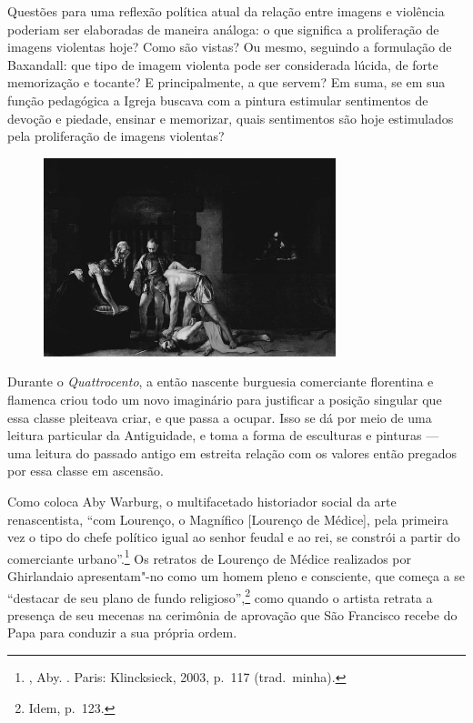 Questões para uma reflexão política atual da relação entre imagens e
violência poderiam ser elaboradas de maneira análoga: o que significa a
proliferação de imagens violentas hoje? Como são vistas? Ou mesmo,
seguindo a formulação de Baxandall: que tipo de imagem violenta pode ser
considerada lúcida, de forte memorização e tocante? E principalmente, a
que servem? Em suma, se em sua função pedagógica a Igreja
buscava com a pintura estimular sentimentos de devoção e
piedade, ensinar e memorizar, quais sentimentos são hoje estimulados
pela proliferação de imagens violentas?


\begin{figure}[!ht]
\centering
 \includegraphics[width=85mm]{./imgs/decapitacao.png}
\caption{\tiny{}}
\end{figure}

\asterisc

Durante o \emph{Quattrocento}, a então nascente burguesia comerciante
florentina e flamenca criou todo um novo imaginário para justificar a
posição singular que essa classe pleiteava criar, e que passa a ocupar.
Isso se dá por meio de uma leitura particular da Antiguidade, e toma a
forma de esculturas e pinturas --- uma leitura do passado antigo em
estreita relação com os valores então pregados por essa classe em
ascensão.

Como coloca Aby Warburg, o multifacetado historiador social da arte
renascentista, ``com Lourenço, o Magnífico {[}Lourenço de
Médice{]}, pela primeira vez o tipo do chefe político igual ao senhor
feudal e ao rei, se constrói a partir do comerciante urbano''.\footnote{, Aby. {}. Paris: Klincksieck, 2003, p.~117 (trad.~minha).}
Os retratos de Lourenço de Médice realizados por Ghirlandaio
apresentam"-no como um homem pleno e consciente, que começa a se
``destacar de seu plano de fundo religioso'',\footnote{Idem, p.~123.}
como quando o artista retrata a presença de seu mecenas na cerimônia de
aprovação que São Francisco recebe do Papa para conduzir a sua própria
ordem.

